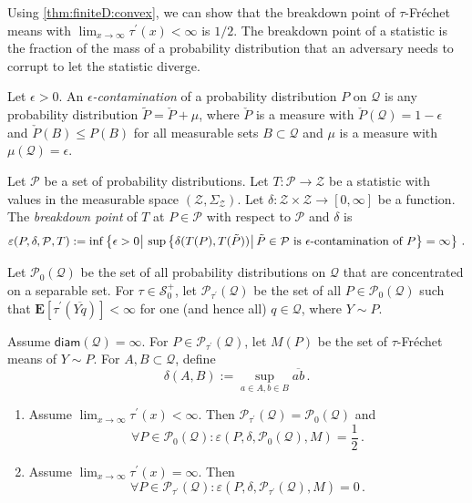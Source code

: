\documentclass{article}
\newcommand*{\mc}[1]{\mathcal{#1}}
\newcommand{\lcb}{\left\lbrace} %
\newcommand{\rcb}{\right\rbrace} %
\newcommand{\cb}[1]{\lcb #1 \rcb} %
\newcommand{\E}{\mathbf{E}} %
\newcommand{\Eof}[1]{\E[#1]}
\newcommand{\sizedMid}[2]{#1 \, \kern-\nulldelimiterspace\mathopen{}\left| \vphantom{#1}\,#2\right.\mathclose{}\kern-\nulldelimiterspace}
\newcommand{\setByEle}[2]{\cb{\sizedMid{#1}{#2}}}
\newcommand{\pr}{^\prime}
\newcommand{\eqfs}{\,.}
\newcommand{\ol}[2]{\overline{#1#2}}
\newcommand{\tran}{\tau}
\newcommand{\dtran}{\tau\pr}
\newcommand{\setcciz}{\mc S_0^+}
\newcommand{\diam}{\mathsf{diam}}
\begin{document}
%
Using \cref{thm:finiteD:convex}, we can show that the breakdown point of $\tran$-Fr\'echet means with $\lim_{x\to\infty}\dtran(x) < \infty$ is $1/2$. The breakdown point of a statistic is the fraction of the mass of a probability distribution that an adversary needs to corrupt to let the statistic diverge.
%
\begin{definition}\label{def:breakdown}
    Let $\epsilon>0$. An \emph{$\epsilon$-contamination} of a probability distribution $P$ on $\mc Q$ is any probability distribution $\tilde P = \check P + \mu$, where $\check P$ is a measure with $\check P(\mc Q) = 1-\epsilon$ and $\check P(B) \leq P(B)$ for all measurable sets $B \subset \mc Q$ and $\mu$ is a measure with $\mu(\mc Q) = \epsilon$.
    
    Let $\mc P$ be a set of probability distributions. Let $T \colon \mc P \to \mc Z$ be a statistic with values in the measurable space $(\mc Z, \Sigma_{\mc Z})$. Let $\delta \colon \mc Z  \times \mc Z \to [0, \infty]$ be a function. The \emph{breakdown point} of $T$ at $P \in \mc P$ with respect to $\mc P$ and $\delta$ is
    \begin{equation}
        \varepsilon(P, \delta, \mc P, T) := \inf\setByEle{\epsilon>0}{\sup\setByEle{\delta(T(P), T(\tilde P))}{\tilde P \in \mc P \text{ is } \epsilon\text{-contamination of } P} = \infty}
        \eqfs
    \end{equation}
\end{definition}
%
Let $\mc P_0(\mc Q)$ be the set of all probability distributions on $\mc Q$ that are concentrated on a separable set.
For $\tran\in\setcciz$, let $\mc P_{\dtran}(\mc Q)$ be the set of all $P \in \mc P_0(\mc Q)$ such that $\Eof{\dtran(\ol Yq)} < \infty$ for one (and hence all) $q \in \mc Q$, where $Y \sim P$. 
%
\begin{theorem}\label{thm:breakdown}
    Assume $\diam(\mc Q) = \infty$.
    For $P \in \mc P_{\dtran}(\mc Q)$, let $M(P)$ be the set of $\tran$-Fr\'echet means of $Y \sim P$.
    For $A, B \subset \mc Q$, define
    \begin{equation}
        \delta(A, B) := \sup_{a\in A, b\in B} \ol ab
        \eqfs
    \end{equation}
    \begin{enumerate}[label=(\roman*)]
        \item
        Assume $\lim_{x\to\infty}\dtran(x) < \infty$. Then $ \mc P_{\dtran}(\mc Q)  =  \mc P_0(\mc Q) $ and
        \begin{equation}
            \forall P\in \mc P_0(\mc Q) \colon \varepsilon(P, \delta, \mc P_0(\mc Q), M) = \frac12
            \eqfs
        \end{equation}
        \item
        Assume $\lim_{x\to\infty}\dtran(x) = \infty$. Then
        \begin{equation}
            \forall P\in \mc P_{\dtran}(\mc Q) \colon\varepsilon(P, \delta, \mc P_{\dtran}(\mc Q), M) = 0
            \eqfs
        \end{equation}
    \end{enumerate}
\end{theorem}
\end{document}
